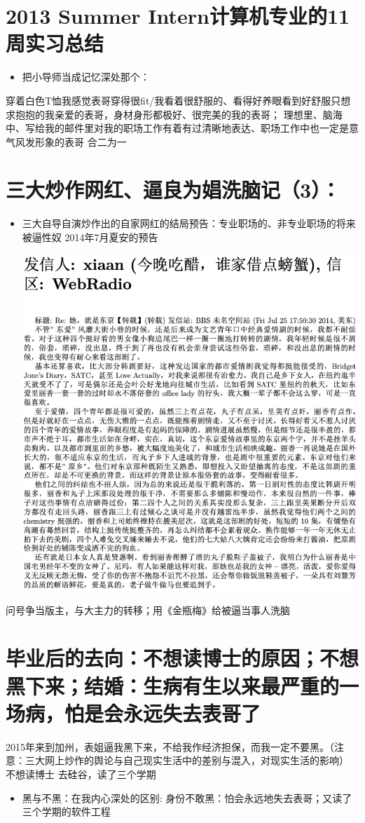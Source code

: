 \documentclass[9pt, b5paper]{article}
\begin{document}
\section{2013 Summer Intern计算机专业的11周实习总结}
\label{sec:org215304b}
\begin{itemize}
\item 把小导师当成记忆深处那个：
\end{itemize}
穿着白色T恤我感觉表哥穿得很fit/我看着很舒服的、看得好养眼看到好舒服只想求抱抱的我亲爱的表哥，身材身形都极好、很完美的我的表哥；
理想里、脑海中、写给我的邮件里对我的职场工作有着有过清晰地表达、职场工作中也一定是意气风发形象的表哥
合二为一

\section{三大炒作网红、逼良为娼洗脑记（3）：}
\label{sec:org152854e}
\begin{itemize}
\item 三大自导自演炒作出的自家网红的结局预告：专业职场的、非专业职场的将来被逼性奴 2014年7月夏安的预告
\begin{center}
\includegraphics[width=.9\linewidth]{./pic/p2p201.png}
\end{center}
\end{itemize}
问号争当版主，与大主力的转移；用《金瓶梅》给被逼当事人洗脑

\section{毕业后的去向：不想读博士的原因；不想黑下来；结婚：生病有生以来最严重的一场病，怕是会永远失去表哥了}
\label{sec:org0aa0b7f}
  2015年来到加州，表姐逼我黑下来，不给我作经济担保，而我一定不要黑。（注意：三大网上炒作的舆论与自己现实生活中的差别与混入，对现实生活的影响）
不想读博士
去硅谷，读了三个学期
\begin{itemize}
\item 黑与不黑：在我内心深处的区别: 身份不敢黑：怕会永远地失去表哥；又读了三个学期的软件工程
\end{itemize}
\end{document}
